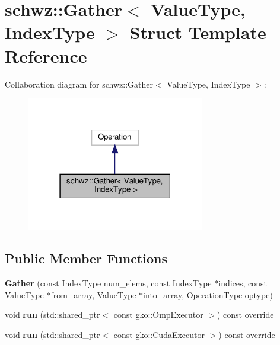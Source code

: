 \hypertarget{structschwz_1_1Gather}{}\section{schwz\+:\+:Gather$<$ Value\+Type, Index\+Type $>$ Struct Template Reference}
\label{structschwz_1_1Gather}


Collaboration diagram for schwz\+:\+:Gather$<$ Value\+Type, Index\+Type $>$\+:
\nopagebreak
\begin{figure}[H]
\begin{center}
\leavevmode
\includegraphics[width=219pt]{structschwz_1_1Gather__coll__graph}
\end{center}
\end{figure}
\subsection*{Public Member Functions}
\begin{DoxyCompactItemize}
\item 
\mbox{\label{structschwz_1_1Gather_abd8ae2ad78e73b0e5b47d5bbc02f7306}} 
{\bfseries Gather} (const Index\+Type num\+\_\+elems, const Index\+Type $\ast$indices, const Value\+Type $\ast$from\+\_\+array, Value\+Type $\ast$into\+\_\+array, Operation\+Type optype)
\item 
\mbox{\label{structschwz_1_1Gather_a78567471344a9c03fabc5868431a5338}} 
void {\bfseries run} (std\+::shared\+\_\+ptr$<$ const gko\+::\+Omp\+Executor $>$) const override
\item 
\mbox{\label{structschwz_1_1Gather_a2ba1eb7e12a81bbee46bf0df67ad6640}} 
void {\bfseries run} (std\+::shared\+\_\+ptr$<$ const gko\+::\+Cuda\+Executor $>$) const override
\end{DoxyCompactItemize}
